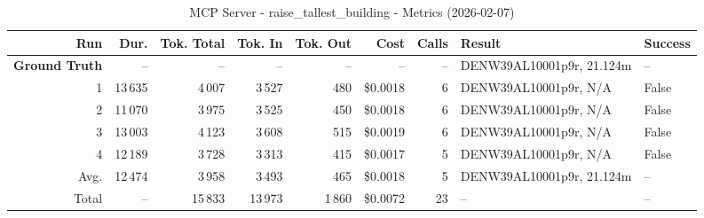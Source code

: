 \documentclass[a4paper,11pt]{article}
\begin{document}
\begin{table}[ht]
\centering
\scriptsize
\caption{MCP Server - raise\_tallest\_building - Metrics (2026-02-07)}
\label{tab:mcp\_raise\_tallest\_building\_metrics\_2026-02-07}
\begin{tabular}{r r r r r r r p{3cm} l}
\hline
Run & Dur. & Tok. Total & Tok. In & Tok. Out & Cost & Calls & Result & Success \\
\hline
\textbf{Ground Truth} & -- & -- & -- & -- & -- & -- & DENW39AL10001p9r, 21.124m & -- \\
1 & 13\,635 & 4\,007 & 3\,527 & 480 & \$0.0018 & 6 & DENW39AL10001p9r, N/A & False \\
2 & 11\,070 & 3\,975 & 3\,525 & 450 & \$0.0018 & 6 & DENW39AL10001p9r, N/A & False \\
3 & 13\,003 & 4\,123 & 3\,608 & 515 & \$0.0019 & 6 & DENW39AL10001p9r, N/A & False \\
4 & 12\,189 & 3\,728 & 3\,313 & 415 & \$0.0017 & 5 & DENW39AL10001p9r, N/A & False \\
\hline
Avg. & 12\,474 & 3\,958 & 3\,493 & 465 & \$0.0018 & 5 & DENW39AL10001p9r, 21.124m & -- \\
Total & -- & 15\,833 & 13\,973 & 1\,860 & \$0.0072 & 23 & -- & -- \\
\hline
\end{tabular}
\end{table}

\clearpage
\end{document}
